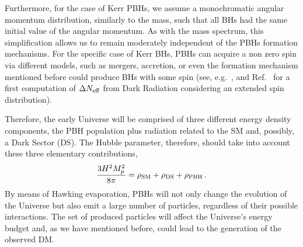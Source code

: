 \documentclass[aps,prd,reprint,twocolumn,preprintnumbers,floatfix,nofootinbib]{revtex4-1}
\newcommand{\be}{\begin{equation}}
\newcommand{\ee}{\end{equation}}
\begin{document}
Furthermore, for the case of Kerr PBHs, we assume a monochromatic angular momentum distribution, similarly to the mass, such that all BHs had the same initial value of the angular momentum. As with the mass spectrum, this simplification allows us to remain moderately independent of the PBHs formation mechanisms.
For the specific case of Kerr BHs, PBHs can acquire a non zero spin via different models, such as mergers, accretion, or even the formation mechanism mentioned before could produce BHs with some spin
(see, e.g.~\cite{Hooper:2020evu,Flores:2021tmc}, 
and Ref.~\cite{Arbey:2021ysg} for a first computation of $\Delta N_{\rm eff}$ from Dark Radiation considering an extended spin distribution).

Therefore, the early Universe will be comprised of three different energy density components, the PBH population plus radiation related to the SM and, possibly, a Dark Sector (DS).
The Hubble parameter, therefore, should take into account these three elementary contributions,
\be\label{eq:Hubble}
\frac{3H^2M_p^2}{8\pi}=\rho_{\rm SM} + \rho_{\rm DS} + \rho_{\rm PBH}\,.
\ee
By means of Hawking evaporation, PBHs will not only change the evolution of the Universe but also emit a large number of particles, regardless of their possible interactions. The set of produced particles will affect the Universe's energy budget and, as we have mentioned before, could lead to the generation of the observed DM.
\end{document}
